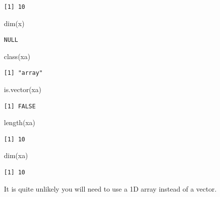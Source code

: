 \documentclass[
]{book}
\newenvironment{Shaded}{\begin{snugshade}}{\end{snugshade}}
\newcommand{\FunctionTok}[1]{\textcolor[rgb]{0.00,0.00,0.00}{#1}}
\newcommand{\NormalTok}[1]{#1}
\begin{document}
\begin{verbatim}
[1] 10
\end{verbatim}

\begin{Shaded}
\begin{Highlighting}[]
\FunctionTok{dim}\NormalTok{(x)}
\end{Highlighting}
\end{Shaded}

\begin{verbatim}
NULL
\end{verbatim}

\begin{Shaded}
\begin{Highlighting}[]
\FunctionTok{class}\NormalTok{(xa)}
\end{Highlighting}
\end{Shaded}

\begin{verbatim}
[1] "array"
\end{verbatim}

\begin{Shaded}
\begin{Highlighting}[]
\FunctionTok{is.vector}\NormalTok{(xa)}
\end{Highlighting}
\end{Shaded}

\begin{verbatim}
[1] FALSE
\end{verbatim}

\begin{Shaded}
\begin{Highlighting}[]
\FunctionTok{length}\NormalTok{(xa)}
\end{Highlighting}
\end{Shaded}

\begin{verbatim}
[1] 10
\end{verbatim}

\begin{Shaded}
\begin{Highlighting}[]
\FunctionTok{dim}\NormalTok{(xa)}
\end{Highlighting}
\end{Shaded}

\begin{verbatim}
[1] 10
\end{verbatim}

It is quite unlikely you will need to use a 1D array instead of a vector.
\end{document}

